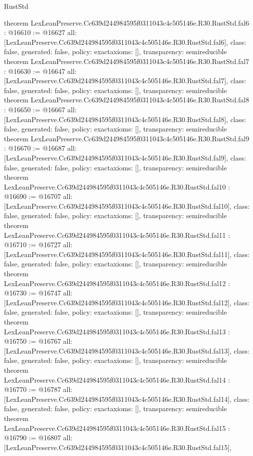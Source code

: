 \begin{lexlean}{RustStd}
\begin{coremodule}
{}
theorem LexLeanPreserve.Cc639d244984595f0311043c4c505146e.R30.RustStd.fal6 : @16610 := @16627 {
  all: [LexLeanPreserve.Cc639d244984595f0311043c4c505146e.R30.RustStd.fal6],
  class: false,
  generated: false,
  policy: exact{axioms: []},
  transparency: semireducible
}
theorem LexLeanPreserve.Cc639d244984595f0311043c4c505146e.R30.RustStd.fal7 : @16630 := @16647 {
  all: [LexLeanPreserve.Cc639d244984595f0311043c4c505146e.R30.RustStd.fal7],
  class: false,
  generated: false,
  policy: exact{axioms: []},
  transparency: semireducible
}
theorem LexLeanPreserve.Cc639d244984595f0311043c4c505146e.R30.RustStd.fal8 : @16650 := @16667 {
  all: [LexLeanPreserve.Cc639d244984595f0311043c4c505146e.R30.RustStd.fal8],
  class: false,
  generated: false,
  policy: exact{axioms: []},
  transparency: semireducible
}
theorem LexLeanPreserve.Cc639d244984595f0311043c4c505146e.R30.RustStd.fal9 : @16670 := @16687 {
  all: [LexLeanPreserve.Cc639d244984595f0311043c4c505146e.R30.RustStd.fal9],
  class: false,
  generated: false,
  policy: exact{axioms: []},
  transparency: semireducible
}
theorem LexLeanPreserve.Cc639d244984595f0311043c4c505146e.R30.RustStd.fal10 : @16690 := @16707 {
  all: [LexLeanPreserve.Cc639d244984595f0311043c4c505146e.R30.RustStd.fal10],
  class: false,
  generated: false,
  policy: exact{axioms: []},
  transparency: semireducible
}
theorem LexLeanPreserve.Cc639d244984595f0311043c4c505146e.R30.RustStd.fal11 : @16710 := @16727 {
  all: [LexLeanPreserve.Cc639d244984595f0311043c4c505146e.R30.RustStd.fal11],
  class: false,
  generated: false,
  policy: exact{axioms: []},
  transparency: semireducible
}
theorem LexLeanPreserve.Cc639d244984595f0311043c4c505146e.R30.RustStd.fal12 : @16730 := @16747 {
  all: [LexLeanPreserve.Cc639d244984595f0311043c4c505146e.R30.RustStd.fal12],
  class: false,
  generated: false,
  policy: exact{axioms: []},
  transparency: semireducible
}
theorem LexLeanPreserve.Cc639d244984595f0311043c4c505146e.R30.RustStd.fal13 : @16750 := @16767 {
  all: [LexLeanPreserve.Cc639d244984595f0311043c4c505146e.R30.RustStd.fal13],
  class: false,
  generated: false,
  policy: exact{axioms: []},
  transparency: semireducible
}
theorem LexLeanPreserve.Cc639d244984595f0311043c4c505146e.R30.RustStd.fal14 : @16770 := @16787 {
  all: [LexLeanPreserve.Cc639d244984595f0311043c4c505146e.R30.RustStd.fal14],
  class: false,
  generated: false,
  policy: exact{axioms: []},
  transparency: semireducible
}
theorem LexLeanPreserve.Cc639d244984595f0311043c4c505146e.R30.RustStd.fal15 : @16790 := @16807 {
  all: [LexLeanPreserve.Cc639d244984595f0311043c4c505146e.R30.RustStd.fal15],
}
\end{coremodule}
\end{lexlean}
